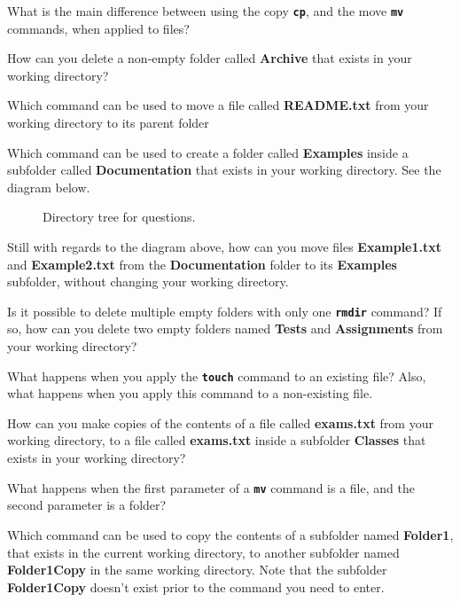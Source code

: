 \begin{exercises}
   \item What is the main difference between using the copy \textbf{\texttt{cp}}, and the move \textbf{\texttt{mv}} commands, when applied to files?
   \item How can you delete a non-empty folder called \textbf{Archive} that exists in your working directory?
   \item Which command can be used to move a file called \textbf{README.txt} from your working directory to its parent folder
   \item Which command can be used to create a folder called \textbf{Examples} inside a subfolder called \textbf{Documentation} that exists in your working directory. See the diagram below.
   \begin{figure}[!htbp]
     \centering
           
           \caption{Directory tree for questions.}
           \label{fig:ch3_dirtree}
   \end{figure}
   \item Still with regards to the diagram above, how can you move files \textbf{Example1.txt} and \textbf{Example2.txt} from the \textbf{Documentation} folder to its \textbf{Examples} subfolder, without changing your working directory.
   \item Is it possible to delete multiple empty folders with only one \textbf{\texttt{rmdir}} command? If so, how can you delete two empty folders named \textbf{Tests} and \textbf{Assignments} from your working directory?
   \item What happens when you apply the \textbf{\texttt{touch}} command to an existing file? Also, what happens when you apply this command to a non-existing file.
   \item How can you make copies of the contents of a file called \textbf{exams.txt} from your working directory, to a file called \textbf{exams.txt} inside a subfolder \textbf{Classes} that exists in your working directory?
   \item What happens when the first parameter of a \textbf{\texttt{mv}} command is a file, and the second parameter is a folder?
   \item Which command can be used to copy the contents of a subfolder named \textbf{Folder1}, that exists in the current working directory, to another subfolder named  \textbf{Folder1Copy} in the same working directory. Note that the subfolder \textbf{Folder1Copy} doesn't exist prior to the command you need to enter.
\end{exercises}
